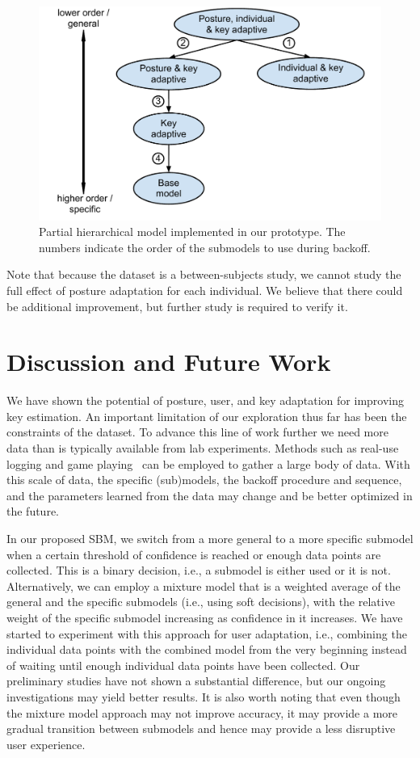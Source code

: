 \documentclass{sigchi}
\begin{document}
\begin{figure}
 \centering
 \includegraphics[width=0.9\columnwidth]{figures/partial-hierarchy.pdf}
 \caption{Partial hierarchical model implemented in our prototype. The numbers indicate the order of the
submodels to use during backoff.}
 \label{fig:partial-hierarchy}
\end{figure}
Note that because the dataset is a between-subjects study, we cannot study
the full effect of posture adaptation for each individual. We believe that there could be additional improvement, but further study is required to verify it.

\section{Discussion and Future Work}
We have shown the potential of posture, user, and key adaptation for
improving key estimation. An important limitation of our exploration thus far has been
the constraints of the dataset. To advance this line of work further we need more data than is typically available from lab experiments. Methods
such as real-use logging and game
playing~\cite{Rudchenko:2011} can be employed to gather a large body of
data. With this scale of data, the specific (sub)models, the
backoff procedure and sequence, and the parameters learned from the
data may change and be better optimized in the future.

In our proposed SBM, we switch from a more general to a more specific submodel
when a certain threshold of confidence is reached or enough data points are
collected. This is a binary decision, i.e., a submodel is either used or it is not.
Alternatively,
we can employ a mixture model that is a weighted average of
the general and the specific submodels (i.e., using soft decisions), with the
relative weight of the specific submodel increasing as confidence in it increases. We have started to experiment with this approach for user adaptation,
i.e., combining the individual data points with the combined model from the very beginning instead
of waiting until enough individual data points have been collected. Our preliminary studies have not shown a substantial difference, but our ongoing investigations may yield better results.
It is also worth noting that even though the mixture model approach may not
improve accuracy, it may provide a more gradual transition between submodels
and hence may provide a less disruptive user experience.
\end{document}
